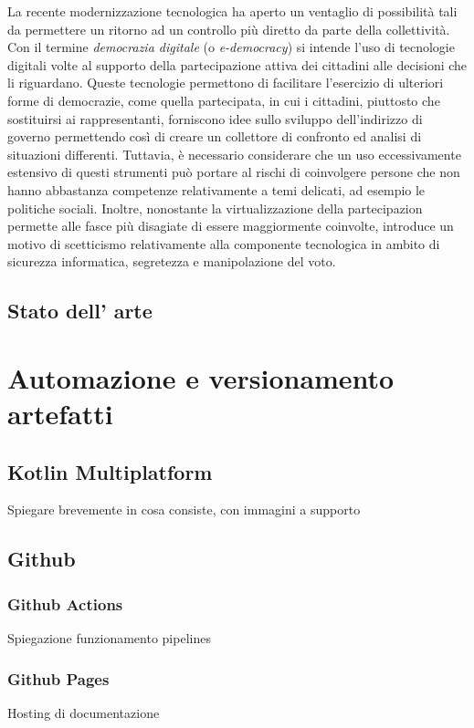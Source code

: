 \documentclass[12pt,a4paper,openright,twoside]{book}
\begin{document}
La recente modernizzazione tecnologica ha aperto un ventaglio di possibilità tali da
permettere un ritorno ad un controllo più diretto da parte della collettività.
Con il termine \textit{democrazia digitale} (o \textit{e-democracy}) si intende l'uso
di tecnologie digitali volte al supporto della partecipazione attiva dei cittadini alle
decisioni che li riguardano. 
Queste tecnologie permettono di facilitare l'esercizio di ulteriori forme di democrazie,
come quella partecipata, in cui i cittadini, piuttosto che
sostituirsi ai rappresentanti, forniscono idee sullo sviluppo dell'indirizzo di governo
permettendo così di creare un collettore di confronto ed analisi di situazioni differenti.
Tuttavia, è necessario considerare che un uso eccessivamente estensivo di questi strumenti
può portare al rischi di coinvolgere persone che non hanno abbastanza competenze relativamente 
a temi delicati, ad esempio le politiche sociali. 
Inoltre, nonostante la virtualizzazione della partecipazion permette alle fasce più disagiate di essere
maggiormente coinvolte, introduce un motivo di scetticismo relativamente alla componente tecnologica
in ambito di sicurezza informatica, segretezza e manipolazione del voto.
\section{Stato dell' arte}
\chapter{Automazione e versionamento artefatti}

\section{Kotlin Multiplatform}
Spiegare brevemente in cosa consiste, con immagini a supporto

\section{Github}

    \subsection{Github Actions}
    Spiegazione funzionamento pipelines

    \subsection{Github Pages}
    Hosting di documentazione
\end{document}
